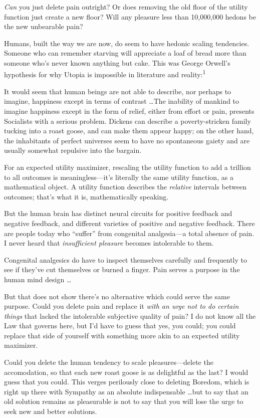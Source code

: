 {
 \textit{Can} you just delete pain outright? Or does removing the
old floor of the utility function just create a new floor? Will any
pleasure less than 10,000,000 hedons be the new unbearable pain?}

{
 Humans, built the way we are now, do seem to have hedonic scaling
tendencies. Someone who can remember starving will appreciate a loaf of
bread more than someone who's never known anything but
cake. This was George Orwell's hypothesis for why
Utopia is impossible in literature and reality:\textsuperscript{1}}

{
 It would seem that human beings are not able to describe, nor
perhaps to imagine, happiness except in terms of contrast \ldots The
inability of mankind to imagine happiness except in the form of relief,
either from effort or pain, presents Socialists with a serious problem.
Dickens can describe a poverty-stricken family tucking into a roast
goose, and can make them appear happy; on the other hand, the
inhabitants of perfect universes seem to have no spontaneous gaiety and
are usually somewhat repulsive into the bargain.}

{
 For an expected utility maximizer, rescaling the utility function
to add a trillion to all outcomes is meaningless---it's
literally the same utility function, as a mathematical object. A
utility function describes the \textit{relative} intervals between
outcomes; that's what it is, mathematically speaking.}

{
 But the human brain has distinct neural circuits for positive
feedback and negative feedback, and different varieties of positive and
negative feedback. There are people today who
``suffer'' from congenital
analgesia---a total absence of pain. I never heard that
\textit{insufficient pleasure} becomes intolerable to them.}

{
 Congenital analgesics do have to inspect themselves carefully and
frequently to see if they've cut themselves or burned a
finger. Pain serves a purpose in the human mind design \ldots}

{
 But that does not show there's no alternative
which could serve the same purpose. Could you delete pain and replace
it \textit{with an urge not to do certain things} that lacked the
intolerable subjective quality of pain? I do not know all the Law that
governs here, but I'd have to guess that yes, you
could; you could replace that side of yourself with something more akin
to an expected utility maximizer.}

{
 Could you delete the human tendency to scale pleasures---delete
the accomodation, so that each new roast goose is as delightful as the
last? I would guess that you could. This verges perilously close to
deleting Boredom, which is right up there with Sympathy as an absolute
indispensable \ldots but to say that an old solution remains as
pleasurable is not to say that you will lose the urge to seek new and
better solutions.}

